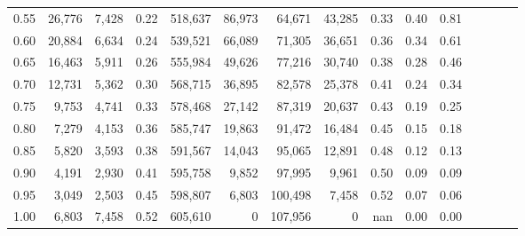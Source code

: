\begin{tabular}{rrrcrrrrrrrrrrr}
0.55 &  26,776 &  7,428 &                                       0.22 &  518,637 &   86,973 &   64,671 &   43,285 &  0.33 &  0.40 &                         0.81 \\
0.60 &  20,884 &  6,634 &                                       0.24 &  539,521 &   66,089 &   71,305 &   36,651 &  0.36 &  0.34 &                         0.61 \\
0.65 &  16,463 &  5,911 &                                       0.26 &  555,984 &   49,626 &   77,216 &   30,740 &  0.38 &  0.28 &                         0.46 \\
0.70 &  12,731 &  5,362 &                                       0.30 &  568,715 &   36,895 &   82,578 &   25,378 &  0.41 &  0.24 &                         0.34 \\
0.75 &   9,753 &  4,741 &                                       0.33 &  578,468 &   27,142 &   87,319 &   20,637 &  0.43 &  0.19 &                         0.25 \\
0.80 &   7,279 &  4,153 &                                       0.36 &  585,747 &   19,863 &   91,472 &   16,484 &  0.45 &  0.15 &                         0.18 \\
0.85 &   5,820 &  3,593 &                                       0.38 &  591,567 &   14,043 &   95,065 &   12,891 &  0.48 &  0.12 &                         0.13 \\
0.90 &   4,191 &  2,930 &                                       0.41 &  595,758 &    9,852 &   97,995 &    9,961 &  0.50 &  0.09 &                         0.09 \\
0.95 &   3,049 &  2,503 &                                       0.45 &  598,807 &    6,803 &  100,498 &    7,458 &  0.52 &  0.07 &                         0.06 \\
1.00 &   6,803 &  7,458 &                                       0.52 &  605,610 &        0 &  107,956 &        0 &   nan &  0.00 &                         0.00 \\
\bottomrule
\end{tabular}
